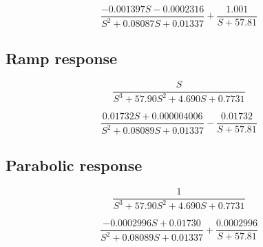 \begin{equation}
\frac{-0.001397 S - 0.0002316}{S^2 + 0.08087 S + 0.01337} + \frac{1.001}{S + 57.81}
\end{equation}

\subsection{Ramp response}

\begin{equation}
\frac{S}{S^3 +57.90 S^2 + 4.690 S +0.7731}
\end{equation}

\begin{equation}
\frac{0.01732 S + 0.000004006}{S^2 +0.08089 S +0.01337} - \frac{0.01732}{S + 57.81}
\end{equation}

\subsection{Parabolic response}

\begin{equation}
\frac{1}{S^3 +57.90 S^2 + 4.690 S +0.7731}
\end{equation}

\begin{equation}
\frac{-0.0002996 S + 0.01730}{S^2 + 0.08089 S + 0.01337}+\frac{0.0002996}{S+ 57.81}
\end{equation}


